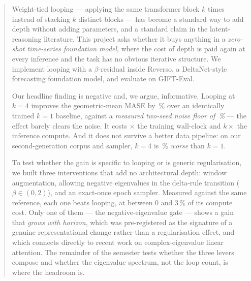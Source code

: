 \begin{abstract}
\noindent
Weight-tied looping --- applying the same transformer block $k$ times instead of
stacking $k$ distinct blocks --- has become a standard way to add depth without
adding parameters, and a standard claim in the latent-reasoning literature.
This project asks whether it buys anything in a \emph{zero-shot time-series
foundation model}, where the cost of depth is paid again at every inference and
the task has no obvious iterative structure. We implement looping with a
$\beta$-residual inside Reverso, a DeltaNet-style forecasting foundation model,
and evaluate on GIFT-Eval.

Our headline finding is negative and, we argue, informative. Looping at $k=4$
improves the geometric-mean MASE by \LoopGain\,\% over an identically trained
$k=1$ baseline, against a \emph{measured two-seed noise floor of
\NoiseFloorKFour\,\%} --- the effect barely clears the noise. It costs
\CostRatio$\times$ the training wall-clock and $k\times$ the inference compute.
And it does not survive a better data pipeline: on our second-generation
corpus and sampler, $k=4$ is \VtwoLoopPenalty\,\% \emph{worse} than $k=1$.

To test whether the gain is specific to looping or is generic regularisation,
we built three interventions that add no architectural depth: window
augmentation, allowing negative eigenvalues in the delta-rule transition
($\beta\in(0,2)$), and an exact-once epoch sampler. Measured against the same
reference, each one beats looping, at between $0$ and $3\,\%$ of its compute
cost. Only one of them --- the negative-eigenvalue gate --- shows a gain that
\emph{grows with horizon}, which was pre-registered as the signature of a
genuine representational change rather than a regularisation effect, and which
connects directly to recent work on complex-eigenvalue linear attention.
The remainder of the semester tests whether the three levers compose and
whether the eigenvalue spectrum, not the loop count, is where the headroom is.
\end{abstract}
